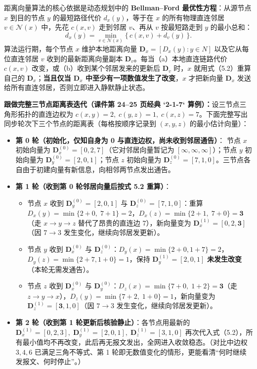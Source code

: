 
距离向量算法的核心依据是动态规划中的 \textbf{Bellman–Ford 最优性方程}：从源节点 $x$ 到目的节点 $y$ 的最短路径代价 $d_x(y)$，等于在 $x$ 的所有物理直连邻居 $v \in \mathcal{N}(x)$ 中，先花 $c(x, v)$ 走到邻居 $v$、再从 $v$ 按最短路走到 $y$ 的最小总和：
\[
d_x(y) = \min_{v \in \mathcal{N}(x)} \bigl\{\, c(x, v) + d_v(y) \,\bigr\}.
\tag{5.2}
\]
算法运行期，每个节点 $x$ 维护本地距离向量 $\mathbf{D}_x = [D_x(y) : y \in N]$ 以及它从每位直连邻居 $v$ 收到的最新距离向量副本 $\mathbf{D}_v$。每当（a）本地直连链路代价 $c(x, v)$ 改变，或（b）收到某个邻居发来的更新后 $\mathbf{D}_v$ 时，$x$ 就用式（5.2）重算自己的 $\mathbf{D}_x$；\textbf{当且仅当 $\mathbf{D}_x$ 中至少有一项数值发生了改变}，$x$ 才把新向量 $\mathbf{D}_x$ 发送给所有直连邻居，否则立即进入静默静止状态。

\textbf{跟做完整三节点距离表迭代（课件第 24–25 页经典 `2-1-7` 算例）：}设三节点三角形拓扑的直连边权为 $c(x, y) = 2,\; c(y, z) = 1,\; c(x, z) = 7$。下面完整写出同步轮次下三个节点的距离表（每格按顺序记录到 $(x, y, z)$ 的最小估计向量）：
\begin{itemize}
\item \textbf{第 0 轮（初始化，仅知自身为 0 与直连边权，尚未收到邻居通告）}：
  节点 $x$ 初始向量为 $\mathbf{D}_x^{(0)} = [0, 2, 7]$（它对邻居向量暂记为 $[\infty, \infty, \infty]$）；节点 $y$ 初始向量为 $\mathbf{D}_y^{(0)} = [2, 0, 1]$；节点 $z$ 初始向量为 $\mathbf{D}_z^{(0)} = [7, 1, 0]$。三节点各自由于初建向量有新信息，向相邻两节点发出通告。
\item \textbf{第 1 轮（收到第 0 轮邻居向量后按式 5.2 重算）}：
  \begin{itemize}
  \item 节点 $x$ 收到 $\mathbf{D}_y^{(0)}=[2,0,1]$ 与 $\mathbf{D}_z^{(0)}=[7,1,0]$：重算 $D_x(y) = \min\{2+0,\; 7+1\} = 2$，$D_x(z) = \min\{2+1,\; 7+0\} = \mathbf{3}$（走 $x\to y\to z$ 替代了昂贵的直连边 7），新向量变为 $\mathbf{D}_x^{(1)} = [0, 2, \mathbf{3}]$（因 $7\to 3$ 发生变化，继续向邻居发更新）。
  \item 节点 $y$ 收到 $\mathbf{D}_x^{(0)}$ 与 $\mathbf{D}_z^{(0)}$：$D_y(x)=\min\{2+0, 1+7\}=2$，$D_y(z)=\min\{2+7, 1+0\}=1$，保持 $\mathbf{D}_y^{(1)} = [2, 0, 1]$ \textbf{未发生改变}（本轮无需发通告）。
  \item 节点 $z$ 收到 $\mathbf{D}_x^{(0)}$ 与 $\mathbf{D}_y^{(0)}$：$D_z(x) = \min\{7+0,\; 1+2\} = \mathbf{3}$（走 $z\to y\to x$），$D_z(y) = \min\{7+2,\; 1+0\} = 1$，新向量变为 $\mathbf{D}_z^{(1)} = [\mathbf{3}, 1, 0]$（因 $7\to 3$ 发生变化，继续向邻居发更新）。
  \end{itemize}
\item \textbf{第 2 轮（收到第 1 轮更新后核验静止）}：各节点用最新的 $\mathbf{D}_x^{(1)}=[0,2,3],\; \mathbf{D}_y^{(1)}=[2,0,1],\; \mathbf{D}_z^{(1)}=[3,1,0]$ 再次代入式（5.2），所有最小值均不再改变，此后再无报文发出，全网进入收敛稳态。（对比中边权 $3, 4, 6$ 已满足三角不等式、第 1 轮即无数值变化的情形，更能看清“何时继续发报文、何时停止”。）
\end{itemize}

